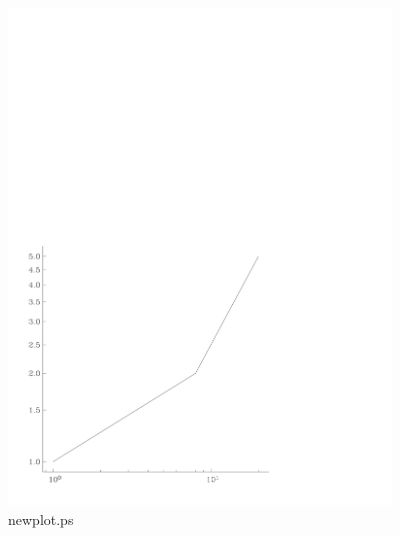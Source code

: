 \documentclass{article}
\begin{document}
\begin{figure}[htbp]
\begin{center}
\includegraphics[width=4in]{gap5}
\caption{newplot.ps}
\label{fig:newplot.ps}
\end{center}
\end{figure}
\end{document}
